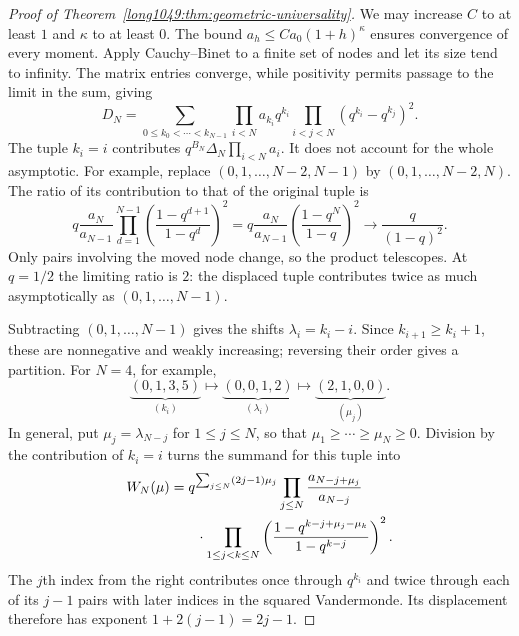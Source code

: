 \documentclass[11pt]{article}
\begin{document}
\begin{proof}[Proof of Theorem~\ref{long1049:thm:geometric-universality}]
We may increase $C$ to at least $1$ and $\kappa$ to at least $0$.
The bound $a_h\le Ca_0(1+h)^\kappa$ ensures convergence of every
moment. Apply Cauchy--Binet to a finite set of nodes and let its
size tend to infinity. The matrix entries converge, while positivity
permits passage to the limit in the sum, giving
\begin{equation}\label{long1049:eq:polynomial-heine}
 D_N=\sum_{0\le k_0<\cdots<k_{N-1}}
 \prod_{i<N}a_{k_i}q^{k_i}
 \prod_{i<j<N}(q^{k_i}-q^{k_j})^2.
\end{equation}
The tuple $k_i=i$ contributes $q^{B_N}\Delta_N\prod_{i<N}a_i$.
It does not account for the whole asymptotic. For example, replace
$(0,1,\ldots,N-2,N-1)$ by $(0,1,\ldots,N-2,N)$. The ratio of
its contribution to that of the original tuple is
\begin{equation}\label{long1049:eq:last-node-shift}
 q\frac{a_N}{a_{N-1}}
 \prod_{d=1}^{N-1}\left(\frac{1-q^{d+1}}{1-q^d}\right)^2
 =q\frac{a_N}{a_{N-1}}\left(\frac{1-q^N}{1-q}\right)^2
 \longrightarrow\frac{q}{(1-q)^2}.
\end{equation}
Only pairs involving the moved node change, so the product
telescopes. At $q=1/2$ the limiting ratio is $2$: the displaced tuple
contributes twice as much asymptotically as $(0,1,\ldots,N-1)$.

Subtracting $(0,1,\ldots,N-1)$ gives the shifts $\lambda_i=k_i-i$.
Since $k_{i+1}\ge k_i+1$, these are nonnegative and weakly increasing;
reversing their order gives a partition. For $N=4$, for example,
\[
 \underbrace{(0,1,3,5)}_{(k_i)}
 \longmapsto\underbrace{(0,0,1,2)}_{(\lambda_i)}
 \longmapsto\underbrace{(2,1,0,0)}_{(\mu_j)}.
\]
In general, put $\mu_j=\lambda_{N-j}$ for $1\le j\le N$, so that
$\mu_1\ge\cdots\ge\mu_N\ge0$. Division by the contribution of
$k_i=i$ turns the summand for this tuple into
\begin{equation}\label{long1049:eq:polynomial-partition}
\begin{split}
 W_N(\mu)={}&q^{\sum_{j\le N}(2j-1)\mu_j}
 \prod_{j\le N}\frac{a_{N-j+\mu_j}}{a_{N-j}}\\
 &\hspace{2mm}\cdot\prod_{1\le j<k\le N}
 \left(\frac{1-q^{k-j+\mu_j-\mu_k}}{1-q^{k-j}}\right)^2.
\end{split}
\end{equation}
The $j$th index from the right contributes once through $q^{k_i}$
and twice through each of its $j-1$ pairs with later indices in
the squared Vandermonde. Its displacement therefore has exponent
$1+2(j-1)=2j-1$.


\end{proof}
\end{document}

